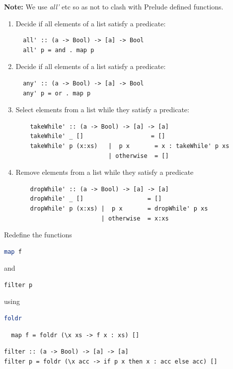 \documentclass{article}
\begin{document}
\begin{solution}
  \textbf{Note:} We use \textit{all'} etc so as not to clash with Prelude defined functions. 
  \begin{enumerate}
    \item Decide if all elements of a list satisfy a predicate:
  \begin{lstlisting}
  all' :: (a -> Bool) -> [a] -> Bool
  all' p = and . map p 
  \end{lstlisting}
    \item Decide if all elements of a list satisfy a predicate:
  \begin{lstlisting}
  any' :: (a -> Bool) -> [a] -> Bool
  any' p = or . map p
  \end{lstlisting}
    \item Select elements from a list while they satisfy a predicate:
  \begin{lstlisting}
    takeWhile' :: (a -> Bool) -> [a] -> [a]
    takeWhile' _ []                   = []
    takeWhile' p (x:xs)   |  p x       = x : takeWhile' p xs
                          | otherwise  = []
    \end{lstlisting}
    \item Remove elements from a list while they satisfy a predicate
  \begin{lstlisting}
    dropWhile' :: (a -> Bool) -> [a] -> [a]
    dropWhile' _ []                  = []
    dropWhile' p (x:xs) |  p x       = dropWhile' p xs
                        | otherwise  = x:xs
  \end{lstlisting}
  \end{enumerate}
\end{solution}

\pagebreak
\begin{exercise} 
Redefine the functions 
\begin{lstlisting}[language=Haskell]
map f
\end{lstlisting}
and
\begin{lstlisting}
filter p
\end{lstlisting}
using
\begin{lstlisting}[language=Haskell]
foldr
\end{lstlisting}

\end{exercise} 

\begin{solution}
  \begin{lstlisting}
  map f = foldr (\x xs -> f x : xs) []
\end{lstlisting}
\begin{lstlisting}
filter :: (a -> Bool) -> [a] -> [a]
filter p = foldr (\x acc -> if p x then x : acc else acc) []
\end{lstlisting}

\end{solution}
\end{document}
